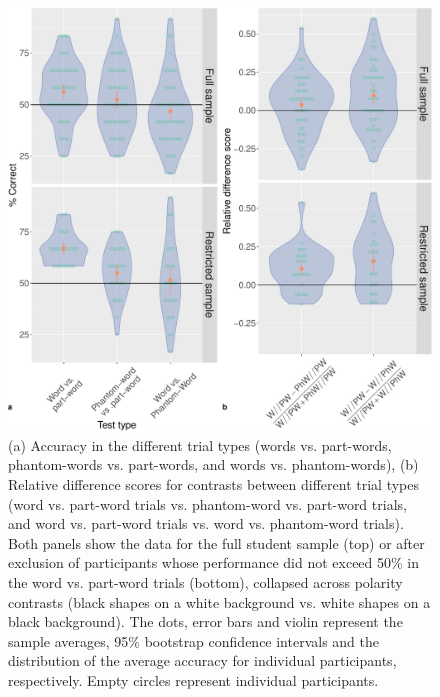 \documentclass[
]{article}
\begin{document}
\begin{figure}

{\centering \includegraphics[width=0.8\linewidth]{vsl_phamtoms_simultaneous_results_files/figure-latex/vsl-simultaneous-fa-plot-accuracy-diff-scores-plot-polarity-collapsed-city-1} 

}

\caption{(a) Accuracy in the different trial types (words vs. part-words, phantom-words vs. part-words, and words vs. phantom-words), (b)  Relative difference scores for contrasts between different trial types (word vs. part-word trials vs. phantom-word vs. part-word trials, and word vs. part-word trials vs. word vs. phantom-word trials). Both panels show the data for the full student sample (top) or after exclusion of participants whose performance did not exceed 50\% in the word vs. part-word trials (bottom), collapsed across polarity contrasts (black shapes on a white background vs. white shapes on a black background). The dots, error bars and violin represent the sample averages, 95\% bootstrap confidence intervals and the distribution of the average accuracy for individual participants, respectively. Empty circles represent individual participants.}\label{fig:vsl-simultaneous-fa-plot-accuracy-diff-scores-plot-polarity-collapsed-city}
\end{figure}
\end{document}
